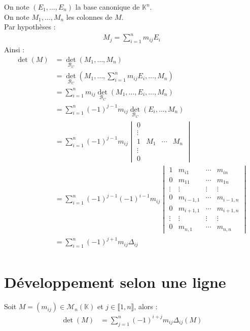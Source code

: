 \documentclass[../main.tex]{subfiles}
\begin{document}
\noindent On note $(E_1, \ldots, E_n)$ la base canonique de $\mathbb{K}^n$. \\
On note $M_1, \ldots, M_n$ les colonnes de $M$. \\
Par hypothèses : 
\begin{align*}
    M_j = \sum_{i=1}^{n} m_{ij} E_i
\end{align*}
Ainsi : 
\begin{align*}
    \operatorname{det}(M) &= \operatorname{det}_{\mathcal{B}_C}(M_1, \ldots, M_n) \\
    &= \operatorname{det}_{\mathcal{B}_C} \left( M_1, \ldots, \sum_{i=1}^{n} m_{ij} E_i, \ldots, M_n \right) \\
    &= \sum_{i=1}^{n} m_{ij} \operatorname{det}_{\mathcal{B}_C}(M_1, \ldots, E_i, \ldots, M_n) \\
    &= \sum_{i=1}^{n} (-1)^{j-1} m_{ij} \operatorname{det}_{\mathcal{B}_C}(E_i, \ldots, M_n) \\
    &= \sum_{i=1}^{n} (-1)^{j-1}m_{ij} \begin{vmatrix}
        0 & & & \\
        \vdots & & & \\
        1 & M_1 & \cdots & M_{n} \\
        \vdots & & & \\
        0 & & &
    \end{vmatrix} \\
    &= \sum_{i=1}^{n} (-1)^{j-1} (-1)^{i-1} m_{ij} \begin{vmatrix}
        1 & m_{i1} & \cdots & m_{in} \\
        0 & m_{11} & \cdots & m_{1n} \\
        \vdots & \vdots & \vdots & \vdots \\
        0 & m_{i-1, 1} & \cdots & m_{i-1, n} \\
        0 & m_{i+1, 1} & \cdots & m_{i+1, n} \\
        \vdots & \vdots & \vdots & \vdots \\
        0 & m_{n, 1} & \cdots & m_{n, n}
    \end{vmatrix} \\
    &= \sum_{i=1}^{n} (-1)^{j+1} m_{ij} \Delta_{ij} \\
\end{align*}

\section{Développement selon une ligne}
\begin{tcolorbox}[title=Théorème 30.59, title filled=false, colframe=orange, colback=orange!10!white]
    Soit $M = (m_{ij})\in \mathcal{M}_n(\mathbb{K})$ et $j\in \llbracket 1, n \rrbracket$, alors :
    \begin{align*}
        \operatorname{det}(M) &= \sum_{j=1}^{n} (-1)^{i+j} m_{ij} \Delta_{ij}(M)
    \end{align*}
\end{tcolorbox}
\end{document}
